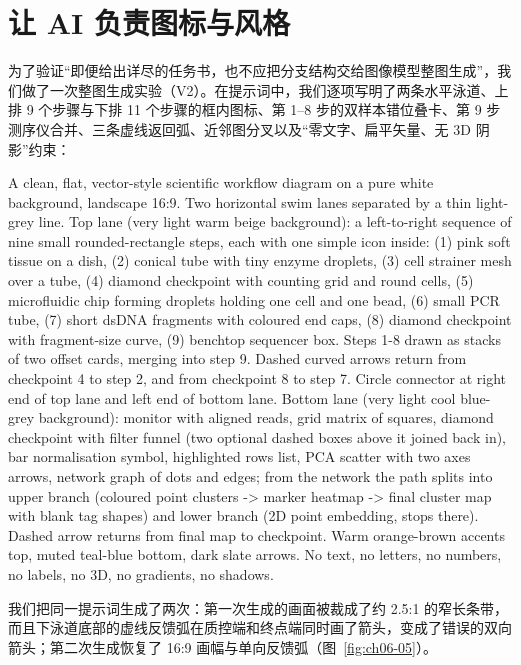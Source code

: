 \section{让 AI 负责图标与风格}

为了验证“即便给出详尽的任务书，也不应把分支结构交给图像模型整图生成”，我们做了一次整图生成实验（V2）。在提示词中，我们逐项写明了两条水平泳道、上排 9 个步骤与下排 11 个步骤的框内图标、第 1–8 步的双样本错位叠卡、第 9 步测序仪合并、三条虚线返回弧、近邻图分叉以及“零文字、扁平矢量、无 3D 阴影”约束：

\begin{Prompt}
A clean, flat, vector-style scientific workflow diagram on a pure white background,
landscape 16:9. Two horizontal swim lanes separated by a thin light-grey line.
Top lane (very light warm beige background): a left-to-right sequence of nine small
rounded-rectangle steps, each with one simple icon inside: (1) pink soft tissue on a dish,
(2) conical tube with tiny enzyme droplets, (3) cell strainer mesh over a tube,
(4) diamond checkpoint with counting grid and round cells, (5) microfluidic chip forming
droplets holding one cell and one bead, (6) small PCR tube, (7) short dsDNA fragments
with coloured end caps, (8) diamond checkpoint with fragment-size curve, (9) benchtop
sequencer box. Steps 1-8 drawn as stacks of two offset cards, merging into step 9.
Dashed curved arrows return from checkpoint 4 to step 2, and from checkpoint 8 to step 7.
Circle connector at right end of top lane and left end of bottom lane.
Bottom lane (very light cool blue-grey background): monitor with aligned reads, grid
matrix of squares, diamond checkpoint with filter funnel (two optional dashed boxes above
it joined back in), bar normalisation symbol, highlighted rows list, PCA scatter with two
axes arrows, network graph of dots and edges; from the network the path splits into upper
branch (coloured point clusters -> marker heatmap -> final cluster map with blank tag
shapes) and lower branch (2D point embedding, stops there). Dashed arrow returns from
final map to checkpoint. Warm orange-brown accents top, muted teal-blue bottom, dark slate
arrows. No text, no letters, no numbers, no labels, no 3D, no gradients, no shadows.
\end{Prompt}

我们把同一提示词生成了两次：第一次生成的画面被裁成了约 2.5:1 的窄长条带，而且下泳道底部的虚线反馈弧在质控端和终点端同时画了箭头，变成了错误的双向箭头；第二次生成恢复了 16:9 画幅与单向反馈弧（图~\ref{fig:ch06-05}）。

